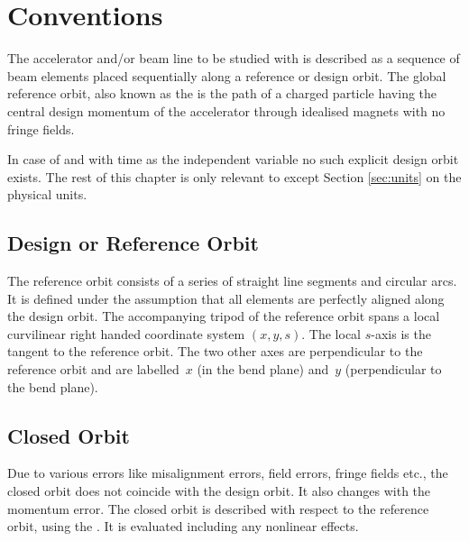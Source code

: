 \chapter{Conventions}

\label{sec:definitions}
The accelerator and/or beam line to be studied with \opalmap is described as
a sequence of beam elements placed sequentially along a reference or
design orbit.
The global reference orbit, also known as the  
is the path of a charged particle having the central design momentum 
of the accelerator through idealised magnets with no fringe fields.

In case of \opalt and \opalcycl with time as the independent variable no such 
explicit design orbit exists.  The rest of this chapter is only relevant to 
\opalmap except Section \ref{sec:units} on the physical units. 


\section{Design or Reference Orbit}
The reference orbit consists of a series of
straight line segments and circular arcs.
It is defined under the assumption that all elements are
perfectly aligned along the design orbit.
The accompanying tripod of the reference orbit spans
a local curvilinear right handed coordinate system $(x,y,s)$.
The local $s$-axis is the tangent to the reference orbit.
The two other axes are perpendicular to the reference orbit and
are labelled~$x$ (in the bend plane)
and~$y$ (perpendicular to the bend plane).

\section{Closed Orbit}
Due to various errors like misalignment errors, field errors,
fringe fields etc.,
the closed orbit does not coincide with the design orbit.
It also changes with the momentum error.
The closed orbit is described with respect to the reference orbit, 
using the .
It is evaluated including any nonlinear effects.

